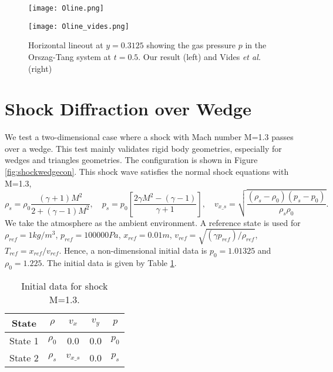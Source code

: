 \begin{figure}
    \centering
    \begin{minipage}{0.46\textwidth}
  \texttt{[image: Oline.png]}
\end{minipage}
\begin{minipage}{0.4\textwidth}
  \texttt{[image: Oline\_vides.png]}
\end{minipage}
    \caption[OrszagTang lineout]{Horizontal lineout at $y=0.3125$ showing the gas pressure $p$ in the Orszag-Tang system at $t=0.5$. Our result (left) and Vides \textit{et al.} \cite{vides2013divergence} (right)}
    \label{fig:enter-label}
\end{figure}
\section{Shock Diffraction over Wedge}
We test a two-dimensional case where a shock with Mach number M=1.3 passes over a wedge. This test mainly validates rigid body geometries, especially for wedges and triangles geometries. The configuration is shown in Figure \ref{fig:shockwedgecon}. This shock wave satisfies the normal shock equations \cite{hernandez2018explicit} with M=1.3,   
\begin{equation*}
    \rho_s=\rho_0\frac{(\gamma+1)M^2}{2+(\gamma-1)M^2},\quad p_s=p_0\left[\frac{2\gamma M^2-(\gamma-1)}{\gamma+1}\right],\quad v_{x\_s}=\sqrt{\frac{(\rho_s-\rho_0)(p_s-p_0)}{\rho_s\rho_0}}.
\end{equation*}
We take the atmosphere as the ambient environment. A reference state is used for $\rho_{ref}=1kg/m^3$, $p_{ref}=100000Pa$, $x_{ref}=0.01m$, $v_{ref}=\sqrt{(\gamma p_{ref})/\rho_{ref}}$, $T_{ref}=x_{ref}/v_{ref}$.
Hence, a non-dimensional initial data is $p_0=1.01325$ and $\rho_0=1.225$.
The initial data is given by Table \ref{tab:shockwedge}.
\begin{table}[H]
\centering
\caption{Initial data for shock M=1.3.}
\begin{tabular}{|c|c|c|c|c|}
\hline
State & $\rho$ & $v_x$ & $v_y$ & $p$ \\
\hline
State 1 & $\rho_0$ & 0.0 & 0.0 & $p_0$\\
\hline
State 2 & $\rho_s$ & $v_{x\_s}$ & 0.0 & $p_s$\\
\hline
\end{tabular}
\label{tab:shockwedge}
\end{table}
